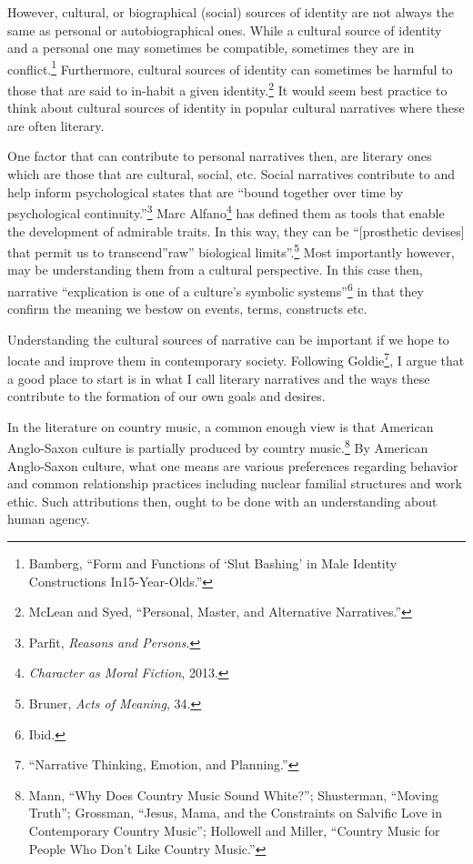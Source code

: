 \documentclass[phdthesis,12pt,final]{wuthesis}
\theoremstyle{definition}
\theoremstyle{definition}
\theoremstyle{definition}
\theoremstyle{definition}
\theoremstyle{remark}
\begin{document}
However, cultural, or biographical (social) sources of identity are not always the same as personal or autobiographical ones. While a cultural source of identity and a personal one may sometimes be compatible, sometimes they are in conflict.\footnote{Bamberg, {``Form and {Functions} of {`{Slut Bashing}'} in {Male Identity Constructions} In15-{Year-Olds}.''}} Furthermore, cultural sources of identity can sometimes be harmful to those that are said to in-habit a given identity.\footnote{McLean and Syed, {``Personal, {Master}, and {Alternative Narratives}.''}} It would seem best practice to think about cultural sources of identity in popular cultural narratives where these are often literary.

One factor that can contribute to personal narratives then, are literary ones which are those that are cultural, social, etc. Social narratives contribute to and help inform psychological states that are ``bound together over time by psychological continuity.''\footnote{Parfit, \emph{Reasons and Persons}.} Marc Alfano\footnote{\emph{Character as Moral Fiction}, 2013.} has defined them as tools that enable the development of admirable traits. In this way, they can be ``{[}prosthetic devises{]} that permit us to transcend''raw'' biological limits''.\footnote{Bruner, \emph{Acts of Meaning}, 34.} Most importantly however, may be understanding them from a cultural perspective. In this case then, narrative ``explication is one of a culture's symbolic systems''\footnote{Ibid.} in that they confirm the meaning we bestow on events, terms, constructs etc.

Understanding the cultural sources of narrative can be important if we hope to locate and improve them in contemporary society. Following Goldie\footnote{{``Narrative {Thinking}, {Emotion}, and {Planning}.''}}, I argue that a good place to start is in what I call literary narratives and the ways these contribute to the formation of our own goals and desires.

In the literature on country music, a common enough view is that American Anglo-Saxon culture is partially produced by country music.\footnote{Mann, {``Why Does Country Music Sound White?''}; Shusterman, {``Moving {Truth}''}; Grossman, {``Jesus, {Mama}, and the {Constraints} on {Salvific Love} in {Contemporary Country Music}''}; Hollowell and Miller, {``Country {Music} for {People Who Don}'t {Like Country Music}.''}} By American Anglo-Saxon culture, what one means are various preferences regarding behavior and common relationship practices including nuclear familial structures and work ethic. Such attributions then, ought to be done with an understanding about human agency.
\end{document}
